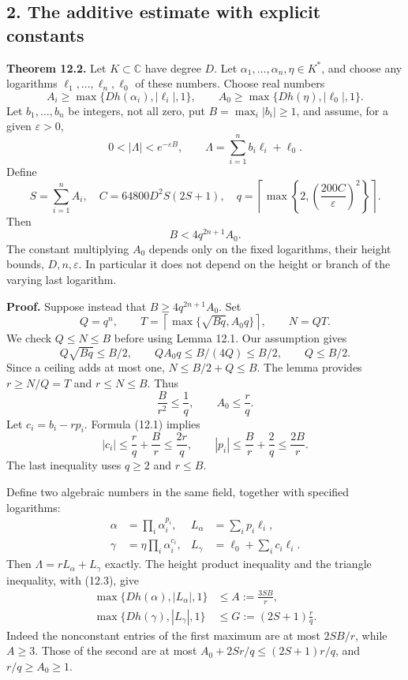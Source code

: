 \documentclass[
  11pt,
  a4paper,
]{article}
\begin{document}
\subsection{2. The additive estimate with explicit
constants}\label{the-additive-estimate-with-explicit-constants}

\textbf{Theorem 12.2.} Let \(K\subset\mathbb C\) have degree \(D\). Let
\(\alpha_1,\ldots,\alpha_n,\eta\in K^*\), and choose any logarithms
\(\ell_1,\ldots,\ell_n,\ell_0\) of these numbers. Choose real numbers \[
A_i\ge\max\{Dh(\alpha_i),|\ell_i|,1\},\qquad
A_0\ge\max\{Dh(\eta),|\ell_0|,1\}.
\tag{12.3}
\] Let \(b_1,\ldots,b_n\) be integers, not all zero, put
\(B=\max_i|b_i|\ge1\), and assume, for a given \(\varepsilon>0\), \[
0<|\Lambda|<e^{-\varepsilon B},\qquad
\Lambda=\sum_{i=1}^n b_i\ell_i+\ell_0.
\tag{12.4}
\] Define \[
S=\sum_{i=1}^n A_i,\quad
C=64800D^2S(2S+1),\quad
q=\left\lceil\max\left\{2,
                  \left(\frac{200C}{\varepsilon}\right)^2\right\}\right\rceil.
\tag{12.5}
\] Then \[
B<4q^{2n+1}A_0.
\tag{12.6}
\] The constant multiplying \(A_0\) depends only on the fixed
logarithms, their height bounds, \(D,n,\varepsilon\). In particular it
does not depend on the height or branch of the varying last logarithm.

\textbf{Proof.} Suppose instead that \(B\ge4q^{2n+1}A_0\). Set \[
Q=q^n,\qquad
T=\left\lceil\max\{\sqrt{Bq},A_0q\}\right\rceil,\qquad
N=QT.
\tag{12.7}
\] We check \(Q\le N\le B\) before using Lemma 12.1. Our assumption
gives \[
Q\sqrt{Bq}\le B/2,\qquad
QA_0q\le B/(4Q)\le B/2,\qquad Q\le B/2.
\] Since a ceiling adds at most one, \(N\le B/2+Q\le B\). The lemma
provides \(r\ge N/Q=T\) and \(r\le N\le B\). Thus \[
\frac B{r^2}\le\frac1q,\qquad A_0\le\frac rq.
\tag{12.8}
\] Let \(c_i=b_i-rp_i\). Formula (12.1) implies \[
|c_i|\le\frac rq+\frac Br\le\frac{2r}{q},\qquad
|p_i|\le\frac Br+\frac2q\le\frac{2B}{r}.
\tag{12.9}
\] The last inequality uses \(q\ge2\) and \(r\le B\).

Define two algebraic numbers in the same field, together with specified
logarithms: \[
\begin{aligned}
\alpha&=\prod_i\alpha_i^{p_i},&
L_\alpha&=\sum_i p_i\ell_i,\\
\gamma&=\eta\prod_i\alpha_i^{c_i},&
L_\gamma&=\ell_0+\sum_i c_i\ell_i.
\end{aligned}
\tag{12.10}
\] Then \(\Lambda=rL_\alpha+L_\gamma\) exactly. The height product
inequality and the triangle inequality, with (12.3), give \[
\begin{aligned}
\max\{Dh(\alpha),|L_\alpha|,1\}&\le A:=\frac{3SB}{r},\\
\max\{Dh(\gamma),|L_\gamma|,1\}&\le G:=(2S+1)\frac rq.
\end{aligned}
\tag{12.11}
\] Indeed the nonconstant entries of the first maximum are at most
\(2SB/r\), while \(A\ge3\). Those of the second are at most
\(A_0+2Sr/q\le(2S+1)r/q\), and \(r/q\ge A_0\ge1\).
\end{document}
